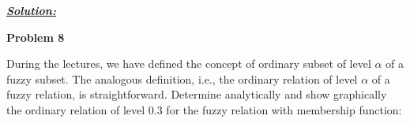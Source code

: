 \documentclass{article}
\begin{document}
\vspace{1cm}

\noindent \underline{\textbf{\textit{Solution:}}}


\newpage
\noindent \textbf{Problem 8}

\noindent During the lectures, we have defined the concept of ordinary subset of level $\alpha$ of a fuzzy 
subset. The analogous definition, i.e., the ordinary relation of level $\alpha$ of a fuzzy relation, is 
straightforward. Determine analytically and show graphically the ordinary relation of level 
0.3 for the fuzzy relation with membership function: 


  
  
\end{document}
